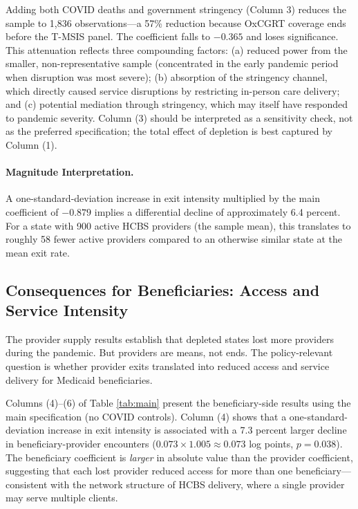 \documentclass[12pt]{article}
\begin{document}
Adding both COVID deaths and government stringency (Column 3) reduces the sample to 1,836 observations---a 57\% reduction because OxCGRT coverage ends before the T-MSIS panel. The coefficient falls to $-0.365$ and loses significance. This attenuation reflects three compounding factors: (a) reduced power from the smaller, non-representative sample (concentrated in the early pandemic period when disruption was most severe); (b) absorption of the stringency channel, which directly caused service disruptions by restricting in-person care delivery; and (c) potential mediation through stringency, which may itself have responded to pandemic severity. Column (3) should be interpreted as a sensitivity check, not as the preferred specification; the total effect of depletion is best captured by Column (1).



\paragraph{Magnitude Interpretation.} A one-standard-deviation increase in exit intensity multiplied by the main coefficient of $-0.879$ implies a differential decline of approximately 6.4 percent. For a state with 900 active HCBS providers (the sample mean), this translates to roughly 58 fewer active providers compared to an otherwise similar state at the mean exit rate.

\subsection{Consequences for Beneficiaries: Access and Service Intensity}

The provider supply results establish that depleted states lost more providers during the pandemic. But providers are means, not ends. The policy-relevant question is whether provider exits translated into reduced access and service delivery for Medicaid beneficiaries.

Columns (4)--(6) of Table \ref{tab:main} present the beneficiary-side results using the main specification (no COVID controls). Column (4) shows that a one-standard-deviation increase in exit intensity is associated with a 7.3 percent larger decline in beneficiary-provider encounters ($0.073 \times 1.005 \approx 0.073$ log points, $p = 0.038$). The beneficiary coefficient is \emph{larger} in absolute value than the provider coefficient, suggesting that each lost provider reduced access for more than one beneficiary---consistent with the network structure of HCBS delivery, where a single provider may serve multiple clients.
\end{document}
